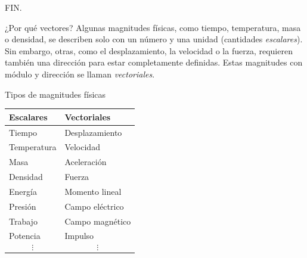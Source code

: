 \begin{frame}

\begin{center}
    \Huge FIN.
\end{center}

\end{frame}

\begin{frame}{¿Por qué vectores?}
    Algunas magnitudes físicas, como tiempo, temperatura, masa o densidad, se describen solo con un número y una unidad (cantidades \textit{escalares}). Sin embargo, otras, como el desplazamiento, la velocidad o la fuerza, requieren también una dirección para estar completamente definidas. Estas magnitudes con módulo y dirección se llaman \textit{vectoriales}.
\end{frame}

\begin{frame}{Tipos de magnitudes físicas}
    \begin{center}
\begin{tabular}{ll}
\toprule
\textbf{Escalares} & \textbf{Vectoriales} \\
\midrule
Tiempo          & Desplazamiento \\
Temperatura     & Velocidad \\
Masa            & Aceleración \\
Densidad        & Fuerza \\
Energía         & Momento lineal \\
Presión         & Campo eléctrico \\
Trabajo         & Campo magnético \\
Potencia        & Impulso \\
$$\vdots$$        & $$\vdots$$ \\
\bottomrule
\end{tabular}
\end{center}
\end{frame}

